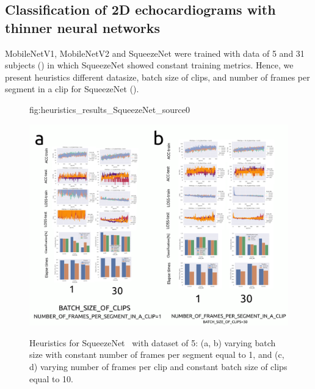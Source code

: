 \documentclass[mlabstract,twocolumn]{jmlr}
\begin{document}
\subsection{Classification of 2D echocardiograms with thinner neural networks} \label{subsec:echocardiogramsthinnerNets}
MobileNetV1, MobileNetV2 and SqueezeNet were trained with data of 5 and 31 subjects () in which SqueezeNet showed constant training metrics.
Hence, we present heuristics different datasize, batch size of clips, and number of frames per segment in a clip for SqueezeNet ().
\begin{figure}[ht]%
\floatconts
  {fig:heuristics_results_SqueezeNet_source0}
  {
      \caption{
          Heuristics for SqueezeNet~\citep{iandola2017squeezenet} with dataset of 5: %
          (a, b) varying batch size with constant number of frames per segment equal to 1, and
          (c, d) varying number of frames per clip and constant batch size of clips equal to 10.
      }
  }
  {\includegraphics[width=\columnwidth]{../figures/heuristics_results_SqueezeNet_source0_with_05-31-subjects/versions/drawing-v03}}%
\end{figure}
\end{document}
